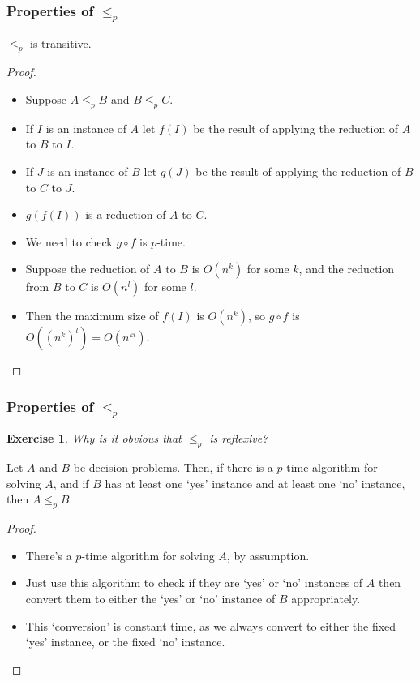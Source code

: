 \documentclass[handout]{beamer}
\newtheorem{exercise}[theorem]{Exercise}{\bfseries}{\upshape}
\begin{document}
\begin{frame}
\frametitle{Properties of $\leq_p$}
\begin{theorem}
$\leq_p$ is transitive.
\end{theorem}
\begin{proof}
\begin{itemize}
\item Suppose $A\leq_p B$ and $B\leq_p C$. 
\item If $I$ is an instance of $A$ let $f(I)$ be the result of applying the reduction of $A$ to $B$ to $I$. 
\item If $J$ is an instance of $B$ let $g(J)$ be the result of applying the reduction of $B$ to $C$ to $J$. 
\item $g(f(I))$ is a reduction of $A$ to $C$. 
\item We need to check $g\circ f$ is $p$-time. 
\item Suppose the reduction of $A$ to $B$ is $O(n^k)$ for some $k$, and the reduction from $B$ to $C$ is $O(n^l)$ for some $l$. 
\item Then the maximum size of $f(I)$ is $O(n^k)$, so $g\circ f$ is $O((n^k)^l)=O(n^{kl})$.
\end{itemize}
\end{proof}
\end{frame}

\begin{frame}
\frametitle{Properties of $\leq_p$}
\begin{exercise}
Why is it obvious that $\leq_p$ is reflexive?
\end{exercise}

\begin{theorem}\label{T:Pmin}
Let $A$ and $B$ be decision problems. Then, if there is a $p$-time algorithm for solving $A$, and if $B$ has at least one `yes' instance and at least one `no' instance, then $A\leq_p B$.
\end{theorem}
\begin{proof}
\begin{itemize}
\item There's a $p$-time algorithm for solving $A$, by assumption. 
\item Just use this algorithm to check if they are `yes' or `no' instances of $A$ then convert them to either the `yes' or `no' instance of $B$ appropriately. 
\item This `conversion' is constant time,  as we always convert to either the fixed `yes' instance, or the fixed `no' instance.
\end{itemize} 
\end{proof}
\end{frame}
\end{document}
